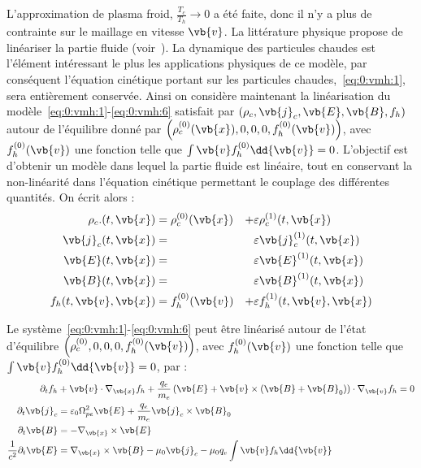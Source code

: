 L'approximation de plasma froid, $\frac{T_c}{T_h}\to 0$ a été faite, donc il n'y a plus de contrainte sur le maillage en vitesse $\vb{v}$. La littérature physique propose de linéariser la partie fluide (voir~\cite{Holderied:2019}). La dynamique des particules chaudes est l'élément intéressant le plus les applications physiques de ce modèle, par conséquent l'équation cinétique portant sur les particules chaudes,~\eqref{eq:0:vmh:1}, sera entièrement conservée. Ainsi on considère maintenant la linéarisation du modèle~\eqref{eq:0:vmh:1}-\eqref{eq:0:vmh:6} satisfait par $(\rho_c,\vb{j}_c,\vb{E},\vb{B},f_h)$ autour de l'équilibre donné par $\left(\rho_c^{(0)}(\vb{x}),0,0,0,f_h^{(0)}(\vb{v})\right)$, avec $f_h^{(0)}(\vb{v})$ une fonction telle que $\int\vb{v}f_h^{(0)}\dd{\vb{v}} = 0$. L'objectif est d'obtenir un modèle dans lequel la partie fluide est linéaire, tout en conservant la non-linéarité dans l'équation cinétique permettant le couplage des différentes quantités. On écrit alors :
\begin{equation}
  \begin{aligned}
    \rho_c. (t,\vb{x}) &= \rho_c^{(0)}(\vb{x}) & + & \varepsilon\rho_c^{(1)}(t,\vb{x}) \\
    \vb{j}_c(t,\vb{x}) &=                      &   & \varepsilon\vb{j}_c^{(1)}(t,\vb{x}) \\
    \vb{E}  (t,\vb{x}) &=                      &   & \varepsilon\vb{E}^{(1)}(t,\vb{x}) \\
    \vb{B}  (t,\vb{x}) &=                      &   & \varepsilon\vb{B}^{(1)}(t,\vb{x}) \\
    f_h(t,\vb{v},\vb{x}) &= f_h^{(0)}(\vb{v})  & + & \varepsilon f_h^{(1)}(t,\vb{v},\vb{x})
  \end{aligned}
  \label{eq:0:linear}
\end{equation}

\begin{pro}
  \label{pro:0:vmhl}
  Le système~\eqref{eq:0:vmh:1}-\eqref{eq:0:vmh:6} peut être linéarisé autour de l'état d'équilibre $\left(\rho_c^{(0)},0,0,0,f_h^{(0)}(\vb{v})\right)$, avec $f_h^{(0)}(\vb{v})$ une fonction telle que $\int\vb{v}f_h^{(0)}\dd{\vb{v}} = 0$, par :
  \begin{align}
    \label{eq:0:vmhl:1}
      \partial_t f_h &+ \vb{v}\cdot\nabla_{\vb{x}} f_h + \frac{q_e}{m_e}\left( \vb{E} + \vb{v}\times(\vb{B}+\vb{B}_0) \right)\cdot\nabla_{\vb{v}} f_h = 0 \\
    \label{eq:0:vmhl:2}
      \partial_t\vb{j}_c &= \varepsilon_0\Omega_{pe}^2\vb{E} + \frac{q_e}{m_e}\vb{j}_c\times\vb{B}_0 \\
    \label{eq:0:vmhl:3}
      \partial_t\vb{B} &= -\nabla_{\vb{x}}\times\vb{E} \\
    \label{eq:0:vmhl:4}
      \frac{1}{c^2}\partial_t\vb{E} &= \nabla_{\vb{x}}\times\vb{B} - \mu_0\vb{j}_c - \mu_0q_e\int\vb{v}f_h\dd{\vb{v}}
  \end{align}
\end{pro}

